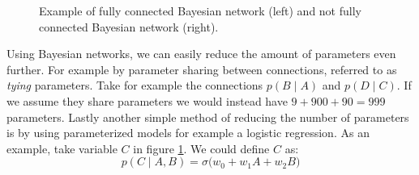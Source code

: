 \begin{figure}[h!]
\centering
\begin{minipage}[c]{0.3\textwidth}
\end{minipage}
\begin{minipage}[c]{0.3\textwidth}
\end{minipage}
\caption{Example of fully connected Bayesian network (left) and
not fully connected Bayesian network (right).}
\label{fig:BN_exmaple_params}
\end{figure}

\noindent
Using Bayesian networks, we can
easily reduce the amount of parameters even further. For example
by parameter sharing between connections, referred to as \textit{tying}
parameters. Take for example the connections $p(B \mid A)$ and 
$p(D \mid C)$. If we assume they share parameters we would instead
have $9 + 900 + 90 = 999$ parameters. Lastly another simple method
of reducing the number of parameters is by using parameterized models
for example a logistic regression. As an example, take variable $C$
in figure \ref{fig:BN_exmaple_params}. We could define $C$ as:
\begin{equation}
p(C \mid A, B) = \sigma\Big( w_0 + w_1 A + w_2 B \Big)
\end{equation}

